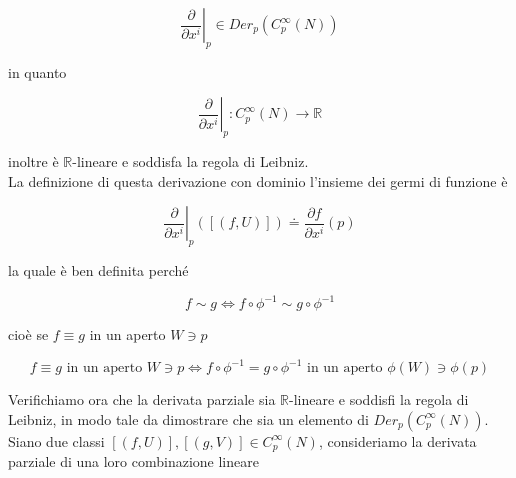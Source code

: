 \begin{equation}
	\left. \dfrac{\partial}{\partial x^{i}} \right|_{p} \in Der_{p}(C_{p}^{\infty}(N))
\end{equation}

in quanto

\begin{equation}
	\left. \dfrac{\partial}{\partial x^{i}} \right|_{p} : C_{p}^{\infty}(N) \to \mathbb{R}
\end{equation}

inoltre è $ \mathbb{R} $-lineare e soddisfa la regola di Leibniz.\\
La definizione di questa derivazione con dominio l'insieme dei germi di funzione è

\begin{equation}
	\left. \dfrac{\partial}{\partial x^{i}} \right|_{p} ([(f,U)]) \doteq \dfrac{\partial f}{\partial x^{i}} (p)
\end{equation}

la quale è ben definita perché

\begin{equation}
	f \sim g \iff f \circ \phi^{-1} \sim g \circ \phi^{-1}
\end{equation}

cioè se $ f \equiv g $ in un aperto $ W \ni p $

\begin{equation}
	 f \equiv g \text{ in un aperto } W \ni p \iff f \circ \phi^{-1} = g \circ \phi^{-1} \text{ in un aperto } \phi(W) \ni \phi(p)
\end{equation}

Verifichiamo ora che la derivata parziale sia $ \mathbb{R} $-lineare e soddisfi la regola di Leibniz, in modo tale da dimostrare che sia un elemento di $ Der_{p}(C_{p}^{\infty}(N)) $.\\
Siano due classi $ [(f,U)],[(g,V)] \in C_{p}^{\infty}(N) $, consideriamo la derivata parziale di una loro combinazione lineare

